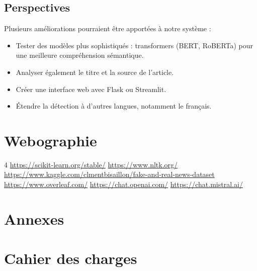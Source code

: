\documentclass[a4paper, 12pt, twoside]{article}
\begin{document}
\subsection{Perspectives}

Plusieurs améliorations pourraient être apportées à notre système :

\begin{itemize}
  \item Tester des modèles plus sophistiqués : transformers (BERT, RoBERTa)
        pour une meilleure compréhension sémantique.
  \item Analyser également le titre et la source de l'article.
  \item Créer une interface web avec Flask ou Streamlit.
  \item Étendre la détection à d'autres langues, notamment le français.
\end{itemize}

\section{Webographie}
\begin{thebibliography}{4}
   \url{https://scikit-learn.org/stable/}
   \url{https://www.nltk.org/}
   \url{https://www.kaggle.com/clmentbisaillon/fake-and-real-news-dataset}
   \url{https://www.overleaf.com/}
   \url{https://chat.openai.com/}
   \url{https://chat.mistral.ai/}
\end{thebibliography}

\newpage

\section{Annexes}
\appendix
\makeatletter
\def\@seccntformat#1{Annexe~\csname the#1\endcsname:\quad}
\makeatother

\section{Cahier des charges}
\end{document}
